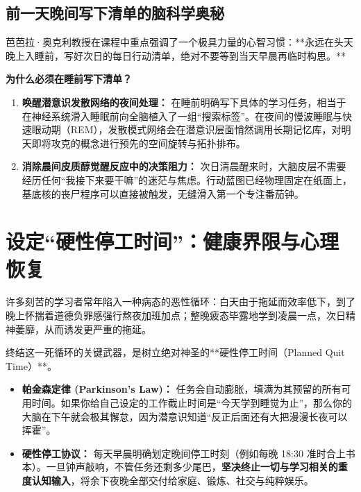 \documentclass[12pt,a4paper,openany]{ctexbook}
\begin{document}
\subsection*{前一天晚间写下清单的脑科学奥秘}

芭芭拉·奥克利教授在课程中重点强调了一个极具力量的心智习惯：**永远在头天晚上入睡前，写好次日的每日行动清单，绝对不要等到当天早晨再临时构思。**

\begin{extensionbox}[前额叶离线加载机制]
\textbf{为什么必须在睡前写下清单？}
\begin{enumerate}
    \item \textbf{唤醒潜意识发散网络的夜间处理：} 
    在睡前明确写下具体的学习任务，相当于在神经系统滑入睡眠前向全脑植入了一组“搜索标签”。在夜间的慢波睡眠与快速眼动期（REM），发散模式网络会在潜意识层面悄然调用长期记忆库，对明天即将攻克的概念进行预先的空间旋转与拓扑排布。
    \item \textbf{消除晨间皮质醇觉醒反应中的决策阻力：} 
    次日清晨醒来时，大脑皮层不需要经历任何“我接下来要干嘛”的迷茫与焦虑。行动蓝图已经物理固定在纸面上，基底核的丧尸程序可以直接被触发，无缝滑入第一个专注番茄钟。
\end{enumerate}
\end{extensionbox}

\section{设定“硬性停工时间”：健康界限与心理恢复}

许多刻苦的学习者常年陷入一种病态的恶性循环：白天由于拖延而效率低下，到了晚上怀揣着道德负罪感强行熬夜加班加点；整晚疲态毕露地学到凌晨一点，次日精神萎靡，从而诱发更严重的拖延。

终结这一死循环的关键武器，是树立绝对神圣的**硬性停工时间（Planned Quit Time）**。

\begin{keypoint}[帕金森定律与硬性截断]
\begin{itemize}
    \item \textbf{帕金森定律 (Parkinson's Law)：} 任务会自动膨胀，填满为其预留的所有可用时间。如果你给自己设定的工作截止时间是“今天学到睡觉为止”，那么你的大脑在下午就会极其懈怠，因为潜意识知道“反正后面还有大把漫漫长夜可以挥霍”。
    \item \textbf{硬性停工协议：} 每天早晨明确划定晚间停工时刻（例如每晚 18:30 准时合上书本）。一旦钟声敲响，不管任务还剩多少尾巴，\textbf{坚决终止一切与学习相关的重度认知输入}，将余下夜晚全部交付给家庭、锻炼、社交与纯粹娱乐。
\end{itemize}
\end{keypoint}
\end{document}
